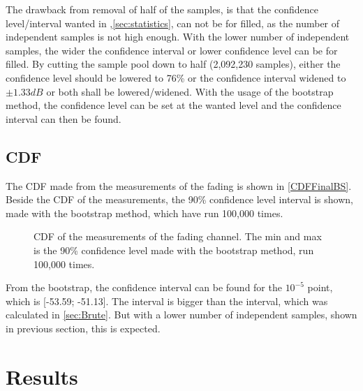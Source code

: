 The drawback from removal of half of the samples, is that the confidence level/interval wanted in ,\autoref{sec:statistics}, can not be for filled, as the number of independent samples is not high enough. With the lower number of independent samples, the wider the confidence interval or lower confidence level can be for filled. By cutting the sample pool down to half (2,092,230 samples), either the confidence level should be lowered to 76\% or the confidence interval widened to $\pm 1.33dB$ or both shall be lowered/widened. With the usage of the bootstrap method, the confidence level can be set at the wanted level and the confidence interval can then be found.


\subsection{CDF}
The CDF made from the measurements of the fading is shown in \autoref{CDFFinalBS}. Beside the CDF of the measurements, the 90\% confidence level interval is shown, made with the bootstrap method, which have run 100,000 times.

\begin{figure}[H]


\caption{CDF of the measurements of the fading channel. The min and max is the 90\% confidence level made with the bootstrap method, run 100,000 times.}
\label{CDFFinalBS}
\end{figure}

From the bootstrap, the confidence interval can be found for the $10^{-5}$ point, which is [-53.59; -51.13]. The interval is bigger than the interval, which was calculated in \autoref{sec:Brute}. But with a lower number of independent samples, shown in previous section, this is expected.


\section{Results}